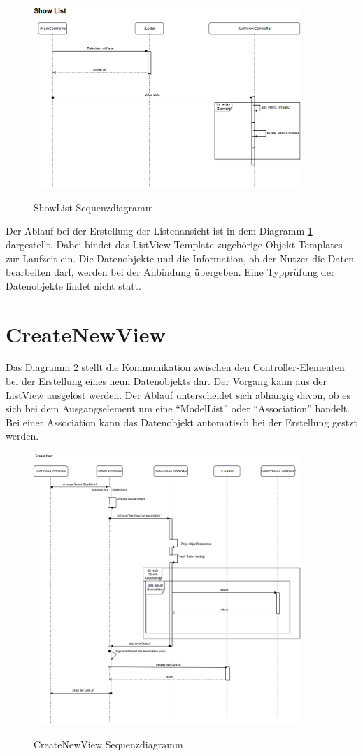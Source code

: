 \begin{figure}[htb!]
	\caption{ShowList Sequenzdiagramm}
	\includegraphics[width=0.9\textwidth]{content/pictures/ShowListSeq}
	\label{pic:showListSeq_diag}
\end{figure}

Der Ablauf bei der Erstellung der Listenansicht ist in dem Diagramm \ref{pic:showListSeq_diag} dargestellt. Dabei bindet 
das ListView-Template zugehörige Objekt-Templates zur Laufzeit ein. Die Datenobjekte und die Information, ob der Nutzer
die Daten bearbeiten darf, werden bei der Anbindung übergeben. Eine Typprüfung der Datenobjekte findet nicht statt.

\section{CreateNewView}

Das Diagramm \ref{pic:createNewViewSeq_diag} stellt die Kommunikation zwischen den Controller-Elementen bei der Erstellung eines neun
Datenobjekts dar. Der Vorgang kann aus der ListView ausgelöst werden. Der Ablauf unterscheidet sich abhängig davon, ob es sich bei
dem Ausgangselement um eine \enquote{ModelList} oder \enquote{Association} handelt. Bei einer Association kann das Datenobjekt automatisch bei der Erstellung gestzt
werden.

\begin{figure}[H]
	\caption{CreateNewView Sequenzdiagramm}
	\includegraphics[width=0.9\textwidth]{content/pictures/CreateNewView}
	\label{pic:createNewViewSeq_diag}
\end{figure}

